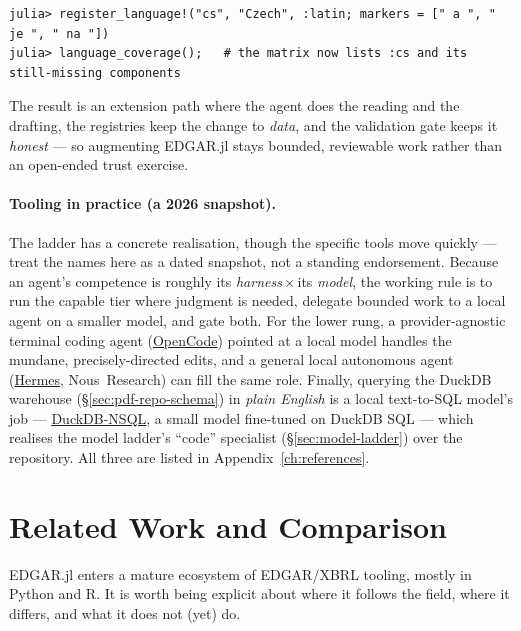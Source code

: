 \documentclass[11pt,a4paper]{report}
\begin{document}
\begin{lstlisting}
julia> register_language!("cs", "Czech", :latin; markers = [" a ", " je ", " na "])
julia> language_coverage();   # the matrix now lists :cs and its still-missing components
\end{lstlisting}

\noindent The result is an extension path where the agent does the reading and the drafting, the registries keep
the change to \emph{data}, and the validation gate keeps it \emph{honest} --- so augmenting EDGAR.jl stays
bounded, reviewable work rather than an open-ended trust exercise.

\paragraph{Tooling in practice (a 2026 snapshot).} The ladder has a concrete realisation, though the specific
tools move quickly --- treat the names here as a dated snapshot, not a standing endorsement. Because an agent's
competence is roughly its \emph{harness}\,$\times$\,its \emph{model}, the working rule is to run the capable tier
where judgment is needed, delegate bounded work to a local agent on a smaller model, and gate both. For the lower rung, a
provider-agnostic terminal coding agent (\href{https://opencode.ai}{OpenCode}) pointed at a local model handles
the mundane, precisely-directed edits, and a general local autonomous agent
(\href{https://hermes-agent.org}{Hermes}, Nous~Research) can fill the same role. Finally, querying the DuckDB
warehouse (\S\ref{sec:pdf-repo-schema}) in \emph{plain English} is a local text-to-SQL model's job ---
\href{https://ollama.com/library/duckdb-nsql}{DuckDB-NSQL}, a small model fine-tuned on DuckDB SQL --- which
realises the model ladder's ``code'' specialist (\S\ref{sec:model-ladder}) over the repository. All three are
listed in Appendix~\ref{ch:references}.


\section{Related Work and Comparison}
\label{sec:related-work}

EDGAR.jl enters a mature ecosystem of EDGAR/XBRL tooling, mostly in Python and R. It is
worth being explicit about where it follows the field, where it differs, and what it does
not (yet) do.
\end{document}
